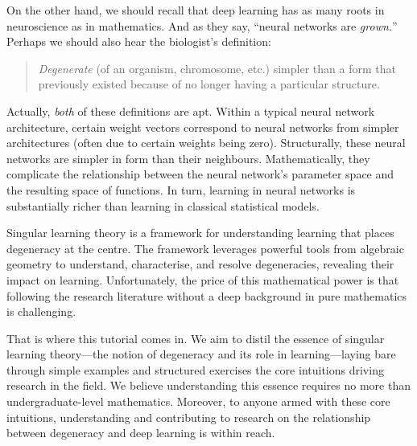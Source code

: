 \documentclass[11pt]{article}
\begin{document}
On the other hand, we should recall that deep learning has as many roots in
neuroscience as in mathematics. And as they say, ``neural networks are
\emph{grown.}'' Perhaps we should also hear the biologist's definition:
\begin{quote}
    \emph{Degenerate} (of an organism, chromosome, etc.) simpler than a form
    that previously existed because of no longer having a particular structure.
\end{quote}

Actually, \emph{both} of these definitions are apt. Within a typical neural
network architecture, certain weight vectors correspond to neural networks from
simpler architectures (often due to certain weights being zero). Structurally,
these neural networks are simpler in form than their neighbours.
Mathematically, they complicate the relationship between the neural network's
parameter space and the resulting space of functions. In turn, learning in
neural networks is substantially richer than learning in classical statistical
models.

Singular learning theory is a framework for understanding learning that places
degeneracy at the centre. The framework leverages powerful tools from algebraic
geometry to understand, characterise, and resolve degeneracies, revealing their
impact on learning. Unfortunately, the price of this mathematical power is that
following the research literature without a deep background in pure mathematics
is challenging.

That is where this tutorial comes in. We aim to distil the essence of singular
learning theory---the notion of degeneracy and its role in learning---laying
bare through simple examples and structured exercises the core intuitions
driving research in the field. We believe understanding this essence requires
no more than undergraduate-level mathematics. Moreover, to anyone armed with
these core intuitions, understanding and contributing to research on the
relationship between degeneracy and deep learning is within reach.
\end{document}
